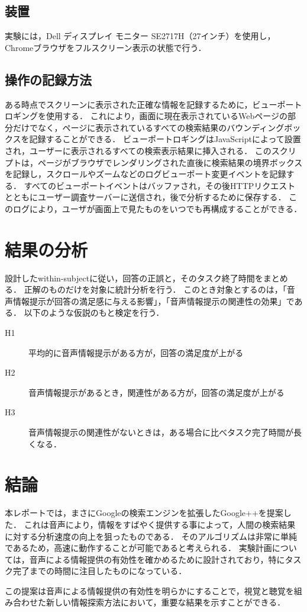 \documentclass[pdflatex,ja=standard]{bxjsarticle}
\begin{document}
\subsection{装置}
実験には，Dell ディスプレイ モニター SE2717H（27インチ）を使用し，Chromeブラウザをフルスクリーン表示の状態で行う．

\subsection{操作の記録方法}
ある時点でスクリーンに表示された正確な情報を記録するために，ビューポートロギングを使用する．
これにより，画面に現在表示されているWebページの部分だけでなく，ページに表示されているすべての検索結果のバウンディングボックスを記録することができる．
ビューポートロギングはJavaScriptによって設置され，ユーザーに表示されるすべての検索表示結果に挿入される．
このスクリプトは，ページがブラウザでレンダリングされた直後に検索結果の境界ボックスを記録し，スクロールやズームなどのログビューポート変更イベントを記録する．
すべてのビューポートイベントはバッファされ，その後HTTPリクエストとともにユーザー調査サーバーに送信され，後で分析するために保存する．
このログにより，ユーザが画面上で見たものをいつでも再構成することができる．


\section{結果の分析}
設計したwithin-subjectに従い，回答の正誤と，そのタスク終了時間をまとめる．
正解のものだけを対象に統計分析を行う．
このとき対象とするのは，「音声情報提示が回答の満足感に与える影響」，「音声情報提示の関連性の効果」である．
以下のような仮説のもと検定を行う．
\begin{description}
    \item[H1] 平均的に音声情報提示がある方が，回答の満足度が上がる
    \item[H2] 音声情報提示があるとき，関連性がある方が，回答の満足度が上がる
    \item[H3] 音声情報提示の関連性がないときは，ある場合に比べタスク完了時間が長くなる．
\end{description}


\section{結論}

本レポートでは，まさにGoogleの検索エンジンを拡張した\textrm{Google++}を提案した．
これは音声により，情報をすばやく提供する事によって，人間の検索結果に対する分析速度の向上を狙ったものである．
そのアルゴリズムは非常に単純であるため，高速に動作することが可能であると考えられる．
実験計画については，音声による情報提供の有効性を確かめるために設計されており，特にタスク完了までの時間に注目したものになっている．

この提案は音声による情報提供の有効性を明らかにすることで，視覚と聴覚を組み合わせた新しい情報探索方法において，重要な結果を示すことができる．


\clearpage



\end{document}
